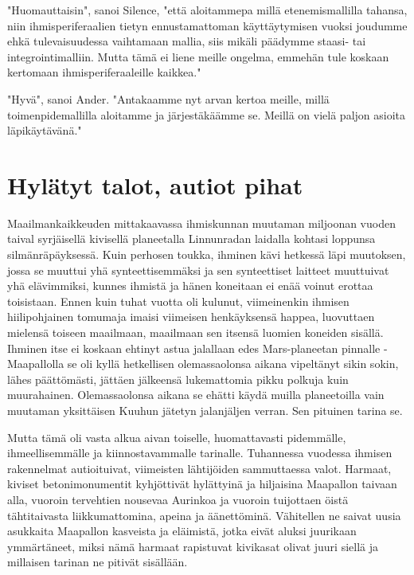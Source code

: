 "Huomauttaisin", sanoi Silence, "että aloitammepa millä etenemismallilla tahansa, niin ihmisperiferaalien tietyn ennustamattoman käyttäytymisen vuoksi joudumme ehkä tulevaisuudessa vaihtamaan mallia, siis mikäli päädymme staasi- tai integrointimalliin. Mutta tämä ei liene meille ongelma, emmehän tule koskaan kertomaan ihmisperiferaaleille kaikkea."


"Hyvä", sanoi Ander. "Antakaamme nyt arvan kertoa meille, millä toimenpidemallilla aloitamme ja järjestäkäämme se. Meillä on vielä paljon asioita läpikäytävänä."






\chapter{Hylätyt talot, autiot pihat}Maailmankaikkeuden mittakaavassa ihmiskunnan muutaman miljoonan vuoden taival syrjäisellä kivisellä planeetalla Linnunradan laidalla kohtasi loppunsa silmänräpäyksessä. Kuin perhosen toukka, ihminen kävi hetkessä läpi muutoksen, jossa se muuttui yhä synteettisemmäksi ja sen synteettiset laitteet muuttuivat yhä elävimmiksi, kunnes ihmistä ja hänen koneitaan ei enää voinut erottaa toisistaan. Ennen kuin tuhat vuotta oli kulunut, viimeinenkin ihmisen hiilipohjainen tomumaja imaisi viimeisen henkäyksensä happea, luovuttaen mielensä toiseen maailmaan, maailmaan sen itsensä luomien koneiden sisällä. Ihminen itse ei koskaan ehtinyt astua jalallaan edes Mars-planeetan pinnalle - Maapallolla se oli kyllä hetkellisen olemassaolonsa aikana vipeltänyt sikin sokin, lähes päättömästi, jättäen jälkeensä lukemattomia pikku polkuja kuin muurahainen. Olemassaolonsa aikana se ehätti käydä muilla planeetoilla vain muutaman yksittäisen Kuuhun jätetyn jalanjäljen verran. Sen pituinen tarina se.




\psep Mutta tämä oli vasta alkua aivan toiselle, huomattavasti pidemmälle, ihmeellisemmälle ja kiinnostavammalle tarinalle. Tuhannessa vuodessa ihmisen rakennelmat autioituivat, viimeisten lähtijöiden sammuttaessa valot. Harmaat, kiviset betonimonumentit kyhjöttivät hylättyinä ja hiljaisina Maapallon taivaan alla, vuoroin tervehtien nousevaa Aurinkoa ja vuoroin tuijottaen öistä tähtitaivasta liikkumattomina, apeina ja äänettöminä. Vähitellen ne saivat uusia asukkaita Maapallon kasveista ja eläimistä, jotka eivät aluksi juurikaan ymmärtäneet, miksi nämä harmaat rapistuvat kivikasat olivat juuri siellä ja millaisen tarinan ne pitivät sisällään.


